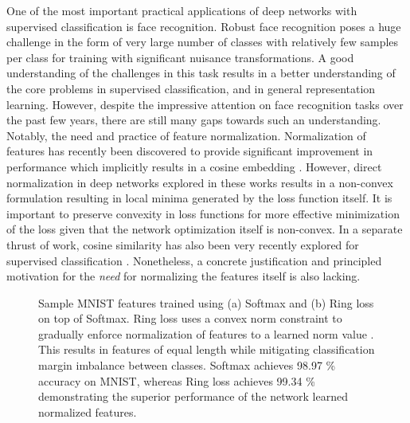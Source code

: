 \documentclass[10pt,twocolumn,letterpaper]{article}
\begin{document}
One of the most important practical applications of deep networks with supervised classification is face recognition. Robust face recognition poses a huge challenge in the form of very large number of classes with relatively few samples per class for training with significant nuisance transformations. A good understanding of the challenges in this task results in a better understanding of the core problems in supervised classification, and in general representation learning. However, despite the impressive attention on face recognition tasks over the past few years, there are still many gaps towards such an understanding. Notably, the need and practice of feature normalization. Normalization of features has recently been discovered to provide significant improvement in performance which implicitly results in a cosine embedding \cite{ranjan2017l2, Wang2017NormFace}. However, direct normalization in deep networks explored in these works results in a non-convex formulation resulting in local minima generated by the loss function itself. It is important to preserve convexity in loss functions for more effective minimization of the loss given that the network optimization itself is non-convex.  In a separate thrust of work, cosine similarity has also been very recently explored for supervised classification \cite{liu2017learning, chunjie2017cosine}. Nonetheless, a concrete justification and principled motivation for the \textit{need} for normalizing the features itself is also lacking.





\begin{figure}\begin{center}
    \end{center}
    \vspace{-0.5cm}
\caption{Sample MNIST features trained using (a) Softmax and (b) Ring loss on top of Softmax. Ring loss uses a convex norm constraint to gradually enforce normalization of features to a learned norm value . This results in features of equal length while mitigating classification margin imbalance between classes. Softmax achieves 98.97 \% accuracy on MNIST, whereas Ring loss achieves 99.34 \% demonstrating the superior performance of the network learned normalized features. } 
\label{fig_sample_visualization}
\vspace{-0.5cm}
\end{figure}
\end{document}
